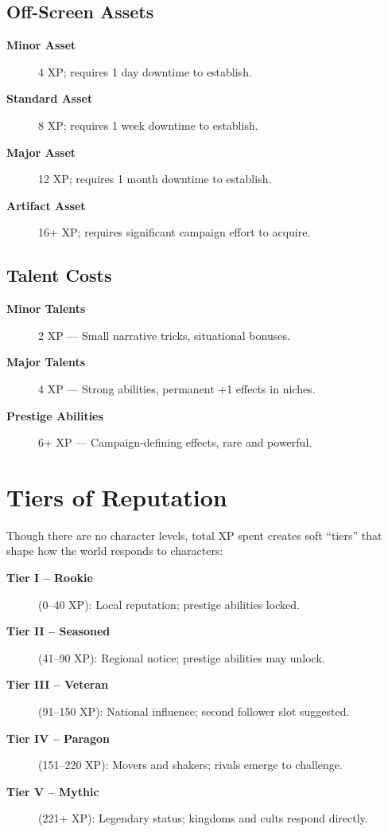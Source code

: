 \subsection{Off-Screen Assets}
\label{subsec:off-screen-assets}

\begin{description}
\item[\textbf{Minor Asset}] 4 XP; requires 1 day downtime to establish.
\item[\textbf{Standard Asset}] 8 XP; requires 1 week downtime to establish.
\item[\textbf{Major Asset}] 12 XP; requires 1 month downtime to establish.
\item[\textbf{Artifact Asset}] 16+ XP; requires significant campaign effort to acquire.
\end{description}

\subsection{Talent Costs}
\label{subsec:talent-costs}

\begin{description}
\item[\textbf{Minor Talents}] 2 XP --- Small narrative tricks, situational bonuses.
\item[\textbf{Major Talents}] 4 XP --- Strong abilities, permanent +1 effects in niches.
\item[\textbf{Prestige Abilities}] 6+ XP --- Campaign-defining effects, rare and powerful.
\end{description}

\section{Tiers of Reputation}
\label{sec:reputation-tiers}

Though there are no character levels, total XP spent creates soft ``tiers'' that shape how the world responds to characters:

\begin{description}
\item[\textbf{Tier I -- Rookie}] (0--40 XP): Local reputation; prestige abilities locked.
\item[\textbf{Tier II -- Seasoned}] (41--90 XP): Regional notice; prestige abilities may unlock.
\item[\textbf{Tier III -- Veteran}] (91--150 XP): National influence; second follower slot suggested.
\item[\textbf{Tier IV -- Paragon}] (151--220 XP): Movers and shakers; rivals emerge to challenge.
\item[\textbf{Tier V -- Mythic}] (221+ XP): Legendary status; kingdoms and cults respond directly.
\end{description}

